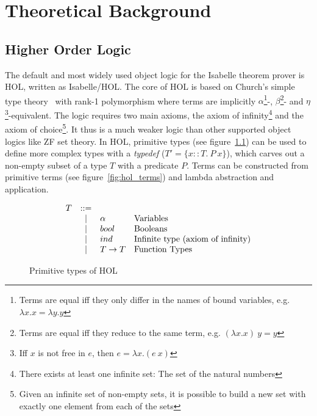 \chapter{Theoretical Background}

\section{Higher Order Logic}

The default and most widely used object logic for the Isabelle theorem prover is \ac{HOL}, written as Isabelle/HOL. The core of \ac{HOL} is based on Church's simple type theory~\cite{simple_type_theory} with rank-1 polymorphism where terms are implicitly $\alpha$\footnote{Terms are equal iff they only differ in the names of bound variables, e.g. $\lambda x.x = \lambda y.y$}-, $\beta$\footnote{Terms are equal iff they reduce to the same term, e.g. $(\lambda x.x) \: y = y$}- and $\eta$\footnote{Iff $x$ is not free in $e$, then $e = \lambda x. (e \: x)$}-equivalent. The logic requires two main axioms, the axiom of infinity\footnote{There exists at least one infinite set: The set of the natural numbers} and the axiom of choice\footnote{Given an infinite set of non-empty sets, it is possible to build a new set with exactly one element from each of the sets}. It thus is a much weaker logic than other supported object logics like \ac{ZF} set theory. In \ac{HOL}, primitive types (see figure~\ref{fig:hol_types}) can be used to define more complex types with a \textit{typedef} ($T' = \{ x :: T. \: P \: x \}$), which carves out a non-empty subset of a type $T$ with a predicate $P$. Terms can be constructed from primitive terms (see figure~\ref{fig:hol_terms}) and lambda abstraction and application.

\begin{figure} %
\[
\begin{array}{rcll}
T  & \bnfeq &  & \\ %
& \bnfor & \alpha & \text{Variables} \\
& \bnfor & bool & \text{Booleans} \\
& \bnfor & ind & \text{Infinite type (axiom of infinity)} \\
& \bnfor & T \to T & \text{Function Types} \\
\end{array}
\]
\caption{Primitive types of \ac{HOL}}
\label{fig:hol_types}
\end{figure}

